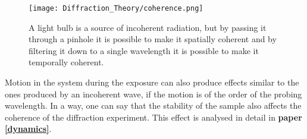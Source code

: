 \begin{figure}[h]
\begin{center}
\texttt{[image: Diffraction\_Theory/coherence.png]}
\end{center}
\caption{A light bulb is a source of incoherent radiation, but by passing it
  through a pinhole it is possible to make it spatially coherent and by
  filtering it down to a single wavelength it is possible to make it temporally coherent. 
}
\label{Fig:coherence}
\end{figure}

Motion in the system during the exposure can also produce effects similar to
the ones produced by an incoherent wave, if the motion is of the order of the probing
wavelength. In a way, one can say that the stability of the sample also affects
the coherence of the diffraction experiment. This effect is analysed in detail
in {\bf paper \ref{dynamics}}.

